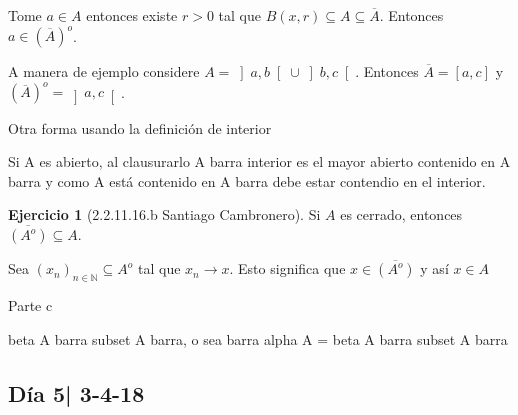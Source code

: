 \documentclass[12pt]{article}
\theoremstyle{plain}
\theoremstyle{definition}
\newtheorem{Ej}[Th]{Ejercicio}
\theoremstyle{remark}
\numberwithin{equation}{section}
\newcommand{\bN}{\mathbb{N}}        %
\renewcommand{\:}{\colon}           %
\newcommand{\bonj}[1]{\left\lbrack#1\right\rbrack}
\newcommand{\obonj}[1]{\left\rbrack#1\right\lbrack}
\begin{document}
\begin{multicols}{2}
\begin{ptcb}
Tome $a\in A$ entonces existe $r>0$ tal que $B(x,r)\subseteq A\subseteq\overline{A}$. Entonces $a\in (\overline{A})^o$. \par
A manera de ejemplo considere $A=\obonj{a,b}\cup\obonj{b,c}$. Entonces $\overline{A}=\bonj{a,c}$ y $(\overline{A})^o=\obonj{a,c}$.
\end{ptcb}

Otra forma usando la definición de interior
\begin{ptcb}
Si A es abierto, al clausurarlo A barra interior es el mayor abierto contenido en A barra y como A está contenido en A barra debe estar contendio en el interior.
\end{ptcb}


\begin{Ej}[2.2.11.16.b Santiago Cambronero]
 Si $A$ es cerrado, entonces $\overline{(A^o)}\subseteq A$.
\end{Ej}

\begin{ptcb}
Sea $(x_n)_{n\in\bN}\subseteq A^o$ tal que $x_n\to x$. Esto significa que $x\in \overline{(A^o)}$ y así $x\in A$
\end{ptcb}

Parte c
\begin{ptcb}
beta A barra subset A barra, o sea barra alpha A = beta A barra subset A barra
\end{ptcb}

\subsection{Día 5| 3-4-18}


\end{multicols}
\end{document}
